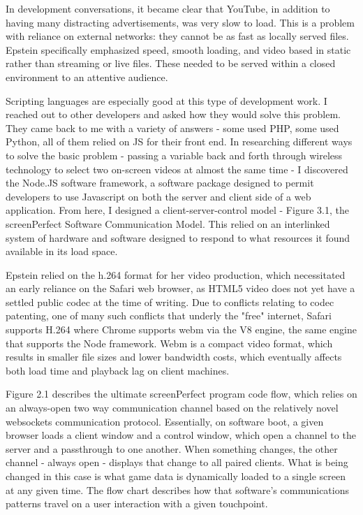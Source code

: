 In development conversations, it became clear that YouTube, in addition to having many distracting advertisements, was very slow to load. This is a problem with reliance on external networks: they cannot be as fast as locally served files. Epstein specifically emphasized speed, smooth loading, and video based in static rather than streaming or live files. These needed to be served within a closed environment to an attentive audience. 

Scripting languages are especially good at this type of development work. I reached out to other developers and asked how they would solve this problem. They came back to me with a variety of answers - some used PHP, some used Python, all of them relied on JS for their front end. In researching different ways to solve the basic problem - passing a variable back and forth through wireless technology to select two on-screen videos at almost the same time - I discovered the Node.JS software framework, a software package designed to permit developers to use Javascript on both the server and client side of a web application. From here, I designed a client-server-control model - Figure 3.1, the screenPerfect Software Communication Model. This relied on an interlinked system of hardware and software designed to respond to what resources it found available in its load space. 

Epstein relied on the h.264 format for her video production, which necessitated an early reliance on the Safari web browser, as HTML5 video does not yet have a settled public codec at the time of writing. Due to conflicts relating to codec patenting, one of many such conflicts that underly the "free" internet, Safari supports H.264 where Chrome supports webm via the V8 engine, the same engine that supports the Node framework. Webm is a compact video format, which results in smaller file sizes and lower bandwidth costs, which eventually affects both load time and playback lag on client machines. 

Figure 2.1 describes the ultimate screenPerfect program code flow, which relies on an always-open two way communication channel based on the relatively novel websockets communication protocol. Essentially, on software boot, a given browser loads a client window and a control window, which open a channel to the server and a passthrough to one another. When something changes, the other channel - always open - displays that change to all paired clients. What is being changed in this case is what game data is dynamically loaded to a single screen at any given time. The flow chart describes how that software's communications patterns travel on a user interaction with a given touchpoint.

